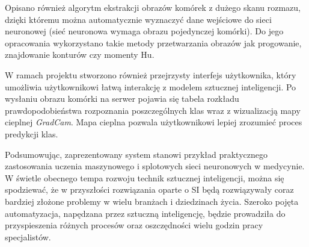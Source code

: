 Opisano również algorytm ekstrakcji obrazów komórek z dużego skanu rozmazu, dzięki któremu można automatycznie wyznaczyć dane wejściowe do sieci neuronowej (sieć neuronowa wymaga obrazu pojedynczej komórki).
Do jego opracowania wykorzystano takie metody przetwarzania obrazów jak progowanie, znajdowanie konturów czy momenty Hu.

W ramach projektu stworzono również przejrzysty interfejs użytkownika, który umożliwia użytkownikowi łatwą interakcję z modelem sztucznej inteligencji.
Po wysłaniu obrazu komórki na serwer pojawia się tabela rozkładu prawdopodobieństwa rozpoznania poszczególnych klas wraz z wizualizacją mapy cieplnej \textit{GradCam}.
Mapa cieplna pozwala użytkownikowi lepiej zrozumieć proces predykcji klas.

Podsumowując, zaprezentowany system stanowi przykład praktycznego zastosowania uczenia maszynowego i splotowych sieci neuronowych w medycynie.
W świetle obecnego tempa rozwoju technik sztucznej inteligencji, można się spodziewać, że w przyszłości rozwiązania oparte o SI będą rozwiązywały coraz bardziej złożone problemy w wielu branżach i dziedzinach życia.
Szeroko pojęta automatyzacja, napędzana przez sztuczną inteligencję, będzie prowadziła do przyspieszenia różnych procesów oraz oszczędności wielu godzin pracy specjalistów.